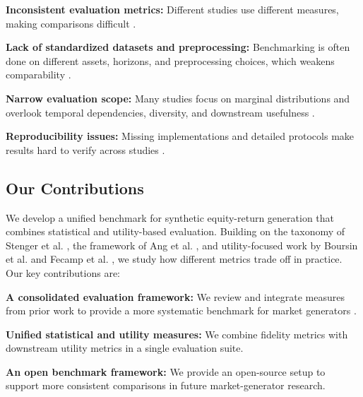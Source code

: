     \begin{enumerate}[label=\textbf{[L\arabic*]}]
      \item \label{limitation:metrics}
        \textbf{Inconsistent evaluation metrics:} Different studies use
        different measures, making comparisons difficult
        \cite{Stenger24}.

      \item \textbf{Lack of standardized datasets and preprocessing:}
        Benchmarking is often done on different assets, horizons, and
        preprocessing choices, which weakens comparability
        \cite{Stenger24}.

      \item \textbf{Narrow evaluation scope:} Many studies focus on
        marginal distributions and overlook temporal dependencies,
        diversity, and downstream usefulness \cite{Stenger24,
        Horvath2025}.

      \item \textbf{Reproducibility issues:} Missing implementations and
        detailed protocols make results hard to verify across studies
        \cite{Stenger24, Potluru24}.
    \end{enumerate}

  \subsection{Our Contributions}
    We develop a unified benchmark for synthetic equity-return
    generation that combines statistical and utility-based evaluation.
    Building on the taxonomy of Stenger et al. \cite{Stenger24}, the
    framework of Ang et al. \cite{Ang23}, and utility-focused work by
    Boursin et al. and Fecamp et al. \cite{Boursin22, Fecamp20}, we
    study how different metrics trade off in practice. Our key
    contributions are:

    \begin{enumerate}[label=\textbf{[C\arabic*]}]
      \item \label{contribute:1} \textbf{A consolidated evaluation
        framework:} We review and integrate measures from prior work
        to provide a more systematic benchmark for market generators
        \cite{Stenger24, Ang23, Boursin22}.

      \item \label{contribute:2} \textbf{Unified statistical and utility
        measures:} We combine fidelity metrics with downstream utility
        metrics in a single evaluation suite.

      \item \label{contribute:3} \textbf{An open benchmark framework:}
        We provide an open-source setup to support more consistent
        comparisons in future market-generator research.
    \end{enumerate}

